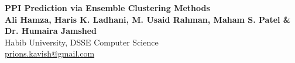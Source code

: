 \documentclass[a0, landscape]{a0poster}
\begin{document}



\begin{minipage}[b]{1\linewidth}
\veryHuge \color{NavyBlue} \textbf{PPI Prediction via Ensemble Clustering Methods} \color{Black}\\ %
\huge \textbf{Ali Hamza, Haris K. Ladhani, M. Usaid Rahman, Maham S. Patel \& Dr. Humaira Jamshed}\\ %
\huge Habib University, DSSE Computer Science\\ %
\Large \href{mailto:prions.kavish@gmail.com}{prions.kavish@gmail.com}\\ %

\end{minipage}
%
%
\vspace{1cm} %

\end{document}
